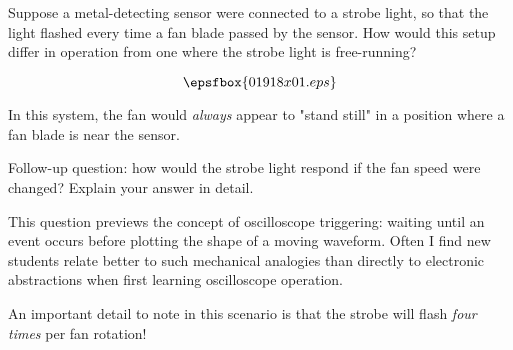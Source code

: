 

Suppose a metal-detecting sensor were connected to a strobe light, so that the light flashed every time a fan blade passed by the sensor.  How would this setup differ in operation from one where the strobe light is free-running?

$$\epsfbox{01918x01.eps}$$







In this system, the fan would {\it always} appear to "stand still" in a position where a fan blade is near the sensor.

\vskip 10pt

Follow-up question: how would the strobe light respond if the fan speed were changed?  Explain your answer in detail.







This question previews the concept of oscilloscope triggering: waiting until an event occurs before plotting the shape of a moving waveform.  Often I find new students relate better to such mechanical analogies than directly to electronic abstractions when first learning oscilloscope operation.

An important detail to note in this scenario is that the strobe will flash {\it four times} per fan rotation!




